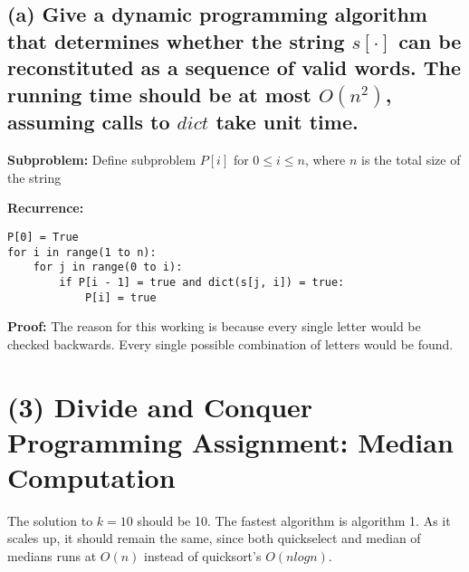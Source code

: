 \documentclass[10pt,letterpaper]{article}
\begin{document}
\subsection*{(a) Give a dynamic programming algorithm that determines whether the string $s[\cdot]$ can be reconstituted as a sequence of valid words. The running time should be at most $O(n^{2})$, assuming calls to $dict$ take unit time.}
\textbf{Subproblem:} Define subproblem $P[i]$ for $0 \leq i \leq n$, where $n$ is the total size of the string

\textbf{Recurrence:}
\begin{lstlisting}
P[0] = True
for i in range(1 to n):
	for j in range(0 to i):
		if P[i - 1] = true and dict(s[j, i]) = true:
			P[i] = true
\end{lstlisting}

\textbf{Proof:} The reason for this working is because every single letter would be checked backwards. Every single possible combination of letters would be found. 

\section*{(3) Divide and Conquer Programming Assignment: Median Computation}
The solution to $k=10$ should be 10. 
The fastest algorithm is algorithm 1. As it scales up, it should remain the same, since both quickselect and median of medians runs at $O(n)$ instead of quicksort's $O(nlogn)$.
\end{document}
